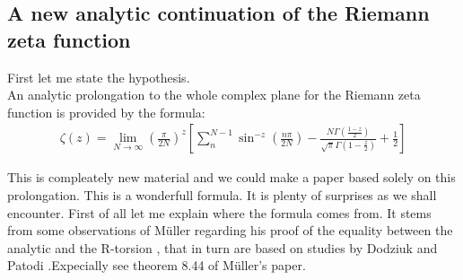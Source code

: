 \documentclass[12pt]{article}
\begin{document}
\subsection{A new analytic continuation of the Riemann zeta function}
First let me state the hypothesis.\\
An analytic prolongation to the whole complex plane for the Riemann zeta function is provided by the formula:
\begin{gather}
\zeta(z)=\lim_{N\rightarrow\infty}\left(\frac{\pi}{2N}\right)^z\left[\sum_n^{N-1} \sin^{-z}\left(\frac{n\pi}{2N}\right)-\frac{N\Gamma\left(\frac{1-z}{2}\right)}{\sqrt{\pi}\Gamma\left(1-\frac{z}{2}\right)}+\frac{1}{2}\right]
\end{gather}

This is compleately new material and we could make a paper based solely on this prolongation. This is a wonderfull formula. It is plenty of surprises as we shall encounter. First of all let me explain where the formula comes from. It stems from some observations of Müller regarding his proof of the equality between the analytic and the R-torsion \cite{Muller}, that in turn are based on studies by Dodziuk and Patodi \cite{DodPat}.Expecially see theorem 8.44 of Müller's paper.
\end{document}
